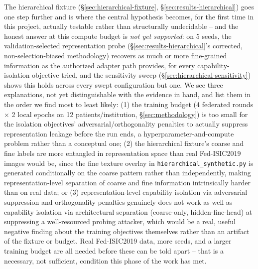 \documentclass[11pt]{article}
\begin{document}
The hierarchical fixture (\S\ref{sec:hierarchical-fixture},
\S\ref{sec:results-hierarchical}) goes one step further and is where the
central hypothesis becomes, for the first time in this project, actually
testable rather than structurally undecidable -- and the honest answer at
this compute budget is \emph{not yet supported}: on 5 seeds, the
validation-selected representation probe (\S\ref{sec:results-hierarchical}'s
corrected, non-selection-biased methodology) recovers as much or more
fine-grained information as the authorized adapter path provides, for
every capability-isolation objective tried, and the sensitivity sweep
(\S\ref{sec:hierarchical-sensitivity}) shows this holds across every swept
configuration but one. We see three explanations, not yet
distinguishable with the evidence in hand, and list them in the order we
find most to least likely: (1) the training budget (4 federated rounds
$\times$ 2 local epochs on 12 patients/institution, \S\ref{sec:methodology})
is too small for the isolation objectives' adversarial/orthogonality
penalties to actually suppress representation leakage before the run ends,
a hyperparameter-and-compute problem rather than a conceptual one; (2) the
hierarchical fixture's coarse and fine labels are more entangled in
representation space than real Fed-ISIC2019 images would be, since the fine
texture overlay in \texttt{hierarchical\_synthetic.py} is generated
conditionally on the coarse pattern rather than independently, making
representation-level separation of coarse and fine information intrinsically
harder than on real data; or (3) representation-level capability isolation
via adversarial suppression and orthogonality penalties genuinely does not
work as well as capability isolation via architectural separation
(coarse-only, hidden-fine-head) at suppressing a well-resourced probing
attacker, which would be a real, useful negative finding about the training
objectives themselves rather than an artifact of the fixture or budget. Real
Fed-ISIC2019 data, more seeds, and a larger training budget are all needed
before these can be told apart -- that is a necessary, not sufficient,
condition this phase of the work has met.
\end{document}
